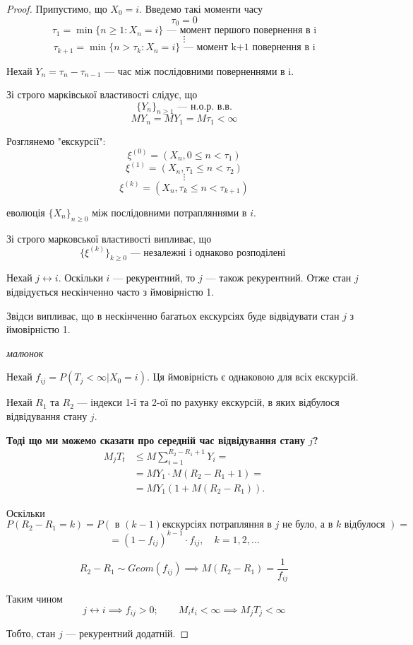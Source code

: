 \begin{proof}
  Припустимо, що $X_0 = i$. Введемо такі моменти часу
  \[ \tau_0 = 0 \] 
  \[ \tau_1 = \min \{n\geq 1: X_n = i \} \text{ --- момент першого повернення в i} \] 
  \[ \vdots \] 
  \[ \tau _{k+1} = \min \{n > \tau_k : X_n = i \} \text{ --- момент k+1 повернення в i}  \] 

  Нехай $Y_n = \tau_n - \tau_{n-1}$ --- час між послідовними поверненнями в i.

  Зі строго марківської властивості слідує, що 
  \[ \{Y_n\} _{n \geq 1} \text{ --- н.о.р. в.в.} \] 
  \[ MY_n = MY_1 = M\tau_1 < \infty \] 

  Розглянемо "екскурсії":
  \[ \xi^{(0)} = \left( X_n, 0 \leq n < \tau_1 \right)  \] 
  \[ \xi^{(1)} = \left( X_n, \tau_1 \leq n < \tau_2 \right)  \] 
  \[ \vdots \] 
  \[ \xi^{(k)} = \left( X_n, \tau_k \leq n < \tau_{k+1} \right)  \] 

  еволюція $\{X_n\} _{n\geq 0}$ між послідовними потрапляннями в $i$.

  Зі строго марковської властивості  випливає, що
  \[ \{\xi^{(k)}\} _{k\geq 0} \text{ --- незалежні і однаково розподілені } \] 

  Нехай $j \leftrightarrow i$. Оскільки $i$ --- рекурентний, то $j$ --- також рекурентний.
  Отже стан $j$ відвідується нескінченно часто з ймовірністю 1.

  Звідси випливає, що в нескінченно багатьох екскурсіях буде відвідувати
  стан $j$ з ймовірністю 1.

  \textit{малюнок}

  Нехай $f_{ij} = P\left( T_j < \infty | X_0 = i \right) $. Ця ймовірність є однаковою для
  всіх екскурсій.

  Нехай $R_1$ та $R_2$ --- індекси 1-ї та 2-ої по рахунку екскурсій, в яких відбулося
  відвідування стану $j$.

  \textbf{Тоді що ми можемо сказати про середній час відвідування стану $j$? }
  \begin{align*}
    M_jT_t &\leq M \sum_{i=1}^{R_2 - R_1 + 1} Y_i = \\
    &= MY_1 \cdot M\left( R_2 - R_1 + 1 \right) = \\
    &= MY_1 \left( 1 + M\left( R_2 - R_1 \right)  \right)
  .\end{align*}

  Оскільки
  \[ P( R_2 - R_1 = k ) = P( \text{ в $(k-1)$
    екскурсіях потрапляння в $j$ не було, а в $k$ відбулося } ) = \] 
  \[ = (1 - f_{ij})^{k-1} \cdot f_{ij}, \quad k = 1, 2, \ldots \] 

  \[ R_2 - R_1 \sim Geom\left( f_{ij} \right) \implies M\left( R_2 - R_1 \right) = \frac{1}{f_{ij}} \]

  Таким чином 
  \[ j \leftrightarrow i \implies f_{ij} > 0; \qquad M_it_i < \infty \implies M_jT_j < \infty \] 

  Тобто, стан $j$ --- рекурентний додатній.
\end{proof}

